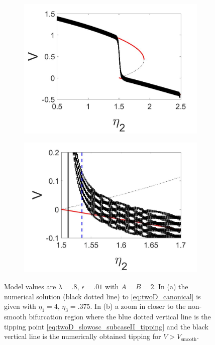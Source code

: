 \begin{figure}[H]
\centering
\begin{subfigure}{.5\textwidth}
 \centering
 \includegraphics[width=\linewidth]{twoD/slowosc_bif_diagram_small.jpg}
 \caption{}
\end{subfigure}%
\begin{subfigure}{.5\textwidth}
 \centering
 \includegraphics[width=\linewidth]{twoD/slowosc_bif_diagram_small_zoom.jpg}
 \caption{}
\end{subfigure}
\caption{Model values are $\lambda=.8$, $\epsilon=.01$ with $A=B=2$. In (a) the numerical solution (black dotted line) to \eqref{eq:twoD_canonical} is given with $\eta_1=4$, $\eta_3=.375$. In (b) a zoom in closer to the non-smooth bifurcation region where the blue dotted vertical line is the tipping point \eqref{eq:twoD_slowosc_subcaseII_tipping} and the black vertical line is the numerically obtained tipping for $V>V_{\text{smooth}}$.}
\label{fig:twoD_slowosc_Vnumerics_small}
\end{figure}

